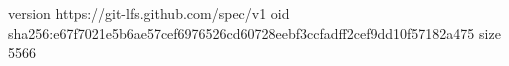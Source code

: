 version https://git-lfs.github.com/spec/v1
oid sha256:e67f7021e5b6ae57cef6976526cd60728eebf3ccfadff2cef9dd10f57182a475
size 5566
